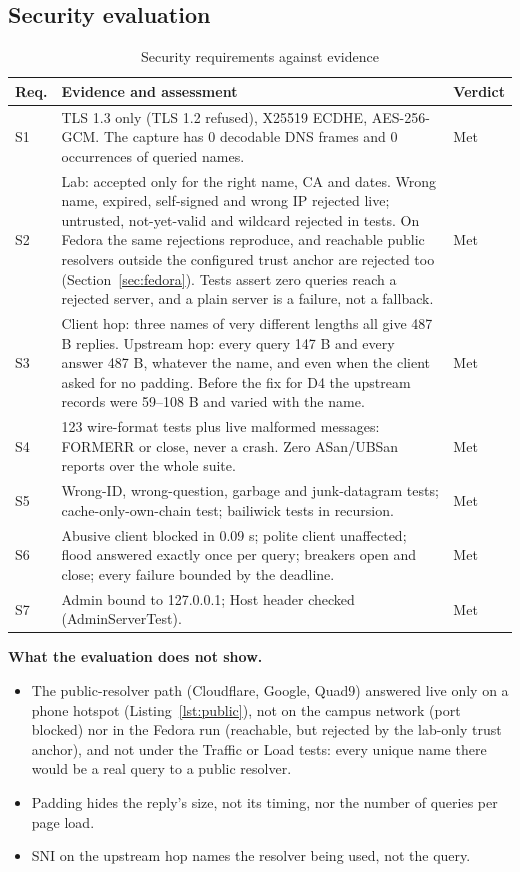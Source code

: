\documentclass[11pt,a4paper]{article}
\begin{document}
\subsection{Security evaluation}
\begin{table}[H]
\centering\small
\caption{Security requirements against evidence}\label{tab:seceval}
\begin{tabularx}{\textwidth}{@{}lLP{2.0cm}@{}}
\toprule
Req. & Evidence and assessment & Verdict \\
\midrule
S1 & TLS 1.3 only (TLS 1.2 refused), X25519 ECDHE, AES-256-GCM. The capture has 0 decodable DNS frames and 0 occurrences of queried names. & Met \\
S2 & Lab: accepted only for the right name, CA and dates. Wrong name, expired, self-signed and wrong IP rejected live; untrusted, not-yet-valid and wildcard rejected in tests. On Fedora the same rejections reproduce, and reachable public resolvers outside the configured trust anchor are rejected too (Section~\ref{sec:fedora}). Tests assert zero queries reach a rejected server, and a plain server is a failure, not a fallback. & Met \\
S3 & Client hop: three names of very different lengths all give 487 B replies. Upstream hop: every query 147 B and every answer 487 B, whatever the name, and even when the client asked for no padding. Before the fix for D4 the upstream records were 59--108 B and varied with the name. & Met \\
S4 & 123 wire-format tests plus live malformed messages: FORMERR or close, never a crash. Zero ASan/UBSan reports over the whole suite. & Met \\
S5 & Wrong-ID, wrong-question, garbage and junk-datagram tests; cache-only-own-chain test; bailiwick tests in recursion. & Met \\
S6 & Abusive client blocked in 0.09 s; polite client unaffected; flood answered exactly once per query; breakers open and close; every failure bounded by the deadline. & Met \\
S7 & Admin bound to 127.0.0.1; Host header checked (AdminServerTest). & Met \\
\bottomrule
\end{tabularx}
\end{table}

\textbf{What the evaluation does not show.}
\begin{itemize}
  \item The public-resolver path (Cloudflare, Google, Quad9) answered live only on a phone hotspot
  (Listing~\ref{lst:public}), not on the campus network (port blocked) nor in the Fedora run (reachable, but
  rejected by the lab-only trust anchor), and not under the Traffic or Load tests: every unique
  name there would be a real query to a public resolver.
  \item Padding hides the reply's size, not its timing, nor the number of queries per page load.
  \item SNI on the upstream hop names the resolver being used, not the query.
\end{itemize}
\end{document}
